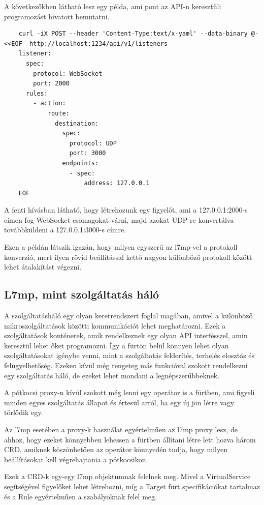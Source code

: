 A következőkben látható lesz egy példa, ami pont az API-n keresztüli programozást
hivatott bemutatni. 

\begin{lstlisting}
	curl -iX POST --header 'Content-Type:text/x-yaml' --data-binary @- <<EOF  http://localhost:1234/api/v1/listeners
	listener:
	  spec:
	    protocol: WebSocket
	    port: 2000
	  rules:
	    - action:
	        route:
	          destination:
	            spec:
  	              protocol: UDP
	              port: 3000
	            endpoints:
	              - spec:
	                  address: 127.0.0.1
	EOF
\end{lstlisting}

A fenti hívásban látható, hogy létrehozunk egy figyelőt, ami a 127.0.0.1:2000-s
címen fog WebSocket csomagokat várni, majd azokat UDP-re konvertálva továbbküldeni 
a 127.0.0.1:3000-s címre.

Ezen a példán látszik igazán, hogy milyen egyszerű az l7mp-vel a protokoll konverzió,
mert ilyen rövid beállítással kettő nagyon különböző protokoll között lehet 
átalakítást végezni.

\subsection{L7mp, mint szolgáltatás háló}

A szolgáltatásháló egy olyan keretrendszert foglal magában, amivel a különböző 
mikroszolgáltatások közötti kommunikációt lehet meghatározni. Ezek a szolgáltatások 
konténerek, amik rendelkeznek egy olyan API interfésszel, amin keresztül lehet 
őket programozni. Így a fürtön belül könnyen lehet olyan szolgáltatásokat 
igénybe venni, mint a szolgáltatás felderítés, terhelés elosztás és felügyelhetőség.
Ezeken kívül még rengeteg más funkcióval szokott rendelkezni egy szolgáltatás háló,
de ezeket lehet mondani a legnépszerűbbeknek. 

A pótkocsi proxy-n kívül szokott még lenni egy operátor is a fürtben, ami figyeli 
minden egyes szolgáltatás állapot és értesül arról, ha egy új jön létre vagy törlődik egy.

Az l7mp esetében a proxy-k használat egyértelműen az l7mp proxy lesz, de ahhoz, hogy ezeket
könnyebben lehessen a fürtben állítani létre lett hozva három CRD, amiknek köszönhetően 
az operátor könnyedén tudja, hogy milyen beállításokat kell végrehajtania a pótkocsikon. 

Ezek a CRD-k egy-egy l7mp objektumnak felelnek meg. Mivel a VirtualService segítségével
figyelőket lehet létrehozni, míg a Target fürt specifikációkat tartalmaz és a Rule 
egyértelműen a szabályoknak felel meg. 

